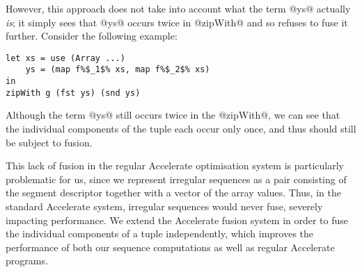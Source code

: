 However, this approach does not take into account what the term @ys@ actually
\emph{is}; it simply sees that @ys@ occurs twice in @zipWith@ and so refuses to
fuse it further. Consider the following example:
%
\begin{lstlisting}
let xs = use (Array ...)
    ys = (map f%$_1$% xs, map f%$_2$% xs)
in
zipWith g (fst ys) (snd ys)
\end{lstlisting}
%
Although the term @ys@ still occurs twice in the @zipWith@, we can see that the
individual components of the tuple each occur only once, and thus should still
be subject to fusion.

This lack of fusion in the regular Accelerate optimisation system is
particularly problematic for us, since we represent irregular sequences as a
pair consisting of the segment descriptor together with a vector of the array
values. Thus, in the standard Accelerate system, irregular sequences would never
fuse, severely impacting performance. We extend the Accelerate fusion system in
order to fuse the individual components of a tuple independently, which improves
the performance of both our sequence computations as well as regular Accelerate
programs.


\endinput







